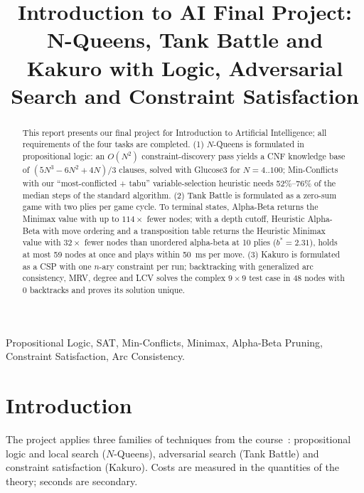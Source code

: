 \documentclass[conference]{IEEEtran}
\begin{document}
\title{Introduction to AI Final Project: N-Queens, Tank Battle and Kakuro with Logic, Adversarial Search and Constraint Satisfaction}

\author{
    \and
    \and
}

\maketitle

\begin{abstract}
This report presents our final project for Introduction to Artificial Intelligence; all requirements of the four tasks are completed.
(1) $N$-Queens is formulated in propositional logic: an $O(N^2)$ constraint-discovery pass yields a CNF knowledge base of $(5N^3-6N^2+4N)/3$ clauses, solved with Glucose3 for $N=4..100$; Min-Conflicts with our ``most-conflicted + tabu'' variable-selection heuristic needs 52\%--76\% of the median steps of the standard algorithm.
(2) Tank Battle is formulated as a zero-sum game with two plies per game cycle. To terminal states, Alpha-Beta returns the Minimax value with up to $114\times$ fewer nodes; with a depth cutoff, Heuristic Alpha-Beta with move ordering and a transposition table returns the Heuristic Minimax value with $32\times$ fewer nodes than unordered alpha-beta at 10 plies ($b^*=2.31$), holds at most 59 nodes at once and plays within 50~ms per move.
(3) Kakuro is formulated as a CSP with one $n$-ary constraint per run; backtracking with generalized arc consistency, MRV, degree and LCV solves the complex $9\times 9$ test case in 48 nodes with 0 backtracks and proves its solution unique.
\end{abstract}

\begin{IEEEkeywords}
Propositional Logic, SAT, Min-Conflicts, Minimax, Alpha-Beta Pruning, Constraint Satisfaction, Arc Consistency.
\end{IEEEkeywords}

\section{Introduction}
The project applies three families of techniques from the course~\cite{aima}: propositional logic and local search ($N$-Queens), adversarial search (Tank Battle) and constraint satisfaction (Kakuro). Costs are measured in the quantities of the theory; seconds are secondary.
\end{document}
